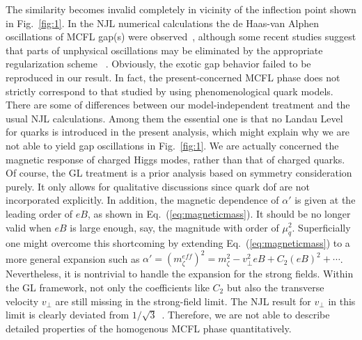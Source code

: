 \documentclass[prd, showpacs,nofootinbib,amsmath,amssymb]{revtex4}
\begin{document}
The similarity becomes invalid completely in vicinity of the inflection point shown in Fig.~\ref{fig:1}. 
In the NJL numerical calculations the de Haas-van Alphen oscillations of MCFL gap(s) were
observed~\cite{ferrer2005magnetic,fukushima2008color}, although some recent studies suggest that parts of
unphysical oscillations may be eliminated by the appropriate regularization scheme ~\cite{allen2015magnetized}.
Obviously, the exotic gap behavior failed to be reproduced in our result. 
In fact, the present-concerned MCFL phase does not strictly correspond to that studied by using phenomenological quark models. There are some of differences between our model-independent treatment and the usual
NJL calculations.
Among them the essential one is that no Landau Level for quarks is introduced in the present analysis, which might explain why we are not able to yield gap oscillations in Fig.~\ref{fig:1}. 
We are actually concerned the magnetic response of charged Higgs modes, rather than that of charged quarks. 
Of course, the GL treatment is a prior analysis based on symmetry consideration purely. It only allows for qualitative discussions since quark dof are not incorporated explicitly. 
In addition, the magnetic dependence of $\alpha'$ is given at the leading order of $eB$, as shown in Eq.~(\ref{eq:magneticmass}). 
It should be no longer valid when $eB$ is large enough, say, the magnitude with order of $\mu_q^2$.
Superficially one might overcome this shortcoming by extending Eq.~(\ref{eq:magneticmass}) to a more general expansion such as $\alpha'=(m_\zeta^{eff})^2 = m_\zeta^2 - v_\perp^2eB + C_2 (eB)^2 + \cdots$. Nevertheless, it is nontrivial to handle the expansion for the strong fields.  
Within the GL framework, not only the coefficients like $C_2$ but also the transverse velocity $v_\perp$ are still missing in the strong-field limit. The NJL result for $v_\perp$ in this limit is clearly deviated from $1/\sqrt{3}$~\cite{sen2015anisotropic}.
Therefore, we are not able to describe detailed properties of the homogenous MCFL phase quantitatively.
\end{document}
